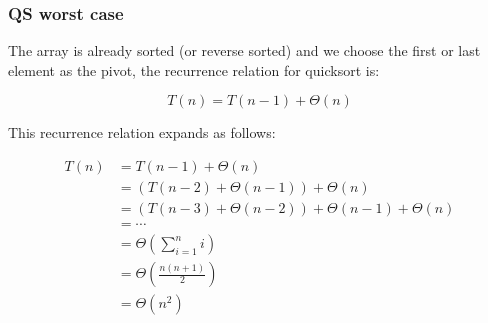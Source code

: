    \subsubsection{QS worst case}
        \begin{definition}
            The array is already sorted (or reverse sorted) and we choose the first or last element as the pivot, the recurrence relation for quicksort is:

            \[
            T(n) = T(n-1) + \Theta(n)
            \]

            \begin{center}
            \end{center}

            \noindent This recurrence relation expands as follows:

            \begin{align*}
                T(n) &= T(n-1) + \Theta(n) \\
                    &= \left(T(n-2) + \Theta(n-1)\right) + \Theta(n) \\
                    &= \left(T(n-3) + \Theta(n-2)\right) + \Theta(n-1) + \Theta(n) \\
                    &= \cdots \\
                    &= \Theta\left(\sum_{i=1}^{n} i\right) \\
                    &= \Theta\left(\frac{n(n+1)}{2}\right) \\
                    &= \Theta(n^2)
            \end{align*}
        \end{definition}

